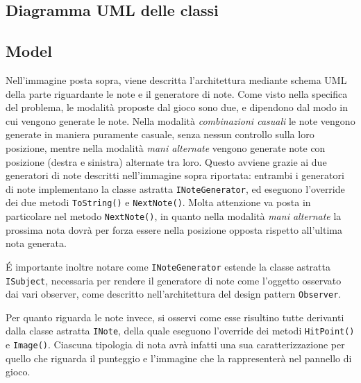 \newpage
\subsection{Diagramma UML delle classi}
\vspace{2cm}
\begin{figure}[h]
\end{figure}

\newpage
\subsection{Model}
\begin{figure}[h]
\end{figure}
\vspace{1cm}

Nell'immagine posta sopra, viene descritta l'architettura mediante schema UML della parte riguardante le note e il generatore di note. Come visto nella specifica del problema, le modalità proposte dal gioco sono due, e dipendono dal modo in cui vengono generate le note. Nella modalità \emph{combinazioni casuali} le note vengono generate in maniera puramente casuale, senza nessun controllo sulla loro posizione, mentre nella modalità \emph{mani alternate} vengono generate note con posizione (destra e sinistra) alternate tra loro. Questo avviene grazie ai due generatori di note descritti nell'immagine sopra riportata: entrambi i generatori di note implementano la classe astratta \texttt{INoteGenerator}, ed eseguono l'override dei due metodi \texttt{ToString()} e \texttt{NextNote()}. Molta attenzione va posta in particolare nel metodo \texttt{NextNote()}, in quanto nella modalità \emph{mani alternate} la prossima nota dovrà per forza essere nella posizione opposta rispetto all'ultima nota generata.

É importante inoltre notare come \texttt{INoteGenerator} estende la classe astratta \texttt{ISubject}, necessaria per rendere il generatore di note come l'oggetto osservato dai vari observer, come descritto nell'architettura del design pattern \texttt{Observer}.

Per quanto riguarda le note invece, si osservi come esse risultino tutte derivanti dalla classe astratta \texttt{INote}, della quale eseguono l'override dei metodi \texttt{HitPoint()} e \texttt{Image()}. Ciascuna tipologia di nota avrà infatti una sua caratterizzazione per quello che riguarda il punteggio e l'immagine che la rappresenterà nel pannello di gioco.

